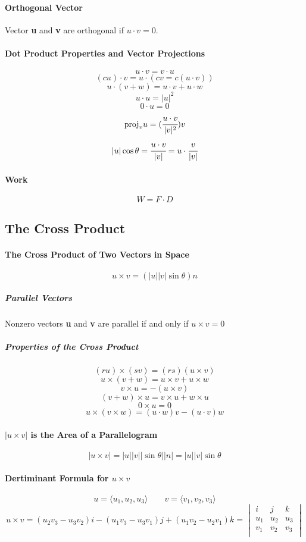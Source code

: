\documentclass{article}
\begin{document}
            \paragraph{Orthogonal Vector}
                Vector \textbf{u} and \textbf{v} are orthogonal if $u\cdot v=0$.
            \paragraph{Dot Product Properties and Vector Projections}
                \[u\cdot v=v\cdot u\]
                \[(cu)\cdot v=u\cdot(cv=c(u\cdot v))\]
                \[u\cdot(v+w)=u\cdot v+u\cdot w\]
                \[u\cdot u=|u|^2\]
                \[0\cdot u=0\]
                \[\text{proj}_v u=(\cfrac{u\cdot v}{|v|^2})v\]
                \[|u|\cos\theta =\cfrac{u\cdot v}{|v|}=u\cdot\cfrac{v}{|v|}\]
            \paragraph{Work}
                \[W=F\cdot D\]
        \subsection{The Cross Product}
            \paragraph{The Cross Product of Two Vectors in Space}
                \[u\times v=(|u||v|\sin\theta)n\]
                \subparagraph{Parallel Vectors}
                    Nonzero vectors \textbf{u} and \textbf{v} are parallel if and only if $u\times v=0$
                \subparagraph{Properties of the Cross Product}
                    \[(ru)\times(sv)=(rs)(u\times v)\]
                    \[u\times(v+w)=u\times v+u\times w\]
                    \[v\times u=-(u\times v)\]
                    \[(v+w)\times u=v\times u+w\times u\]
                    \[0\times u=0\]
                    \[u\times (v\times w)=(u\cdot w)v-(u\cdot v)w\]
            \paragraph{$|u\times v|$ is the Area of a Parallelogram}
                \[|u\times v|=|u||v||\sin\theta||n|=|u||v|\sin\theta\]
            \paragraph{Dertiminant Formula for $u\times v$}
                \[u=\langle u_1,u_2,u_3\rangle\qquad v=\langle v_1,v_2,v_3\rangle\]
                \[u\times v=(u_2v_3-u_3v_2)i-(u_1v_3-u_3v_1)j+(u_1v_2-u_2v_1)k=
                \begin{vmatrix}
                    i&j&k\\
                    u_1&u_2&u_3\\
                    v_1&v_2&v_3\\
                \end{vmatrix}\]
\end{document}
